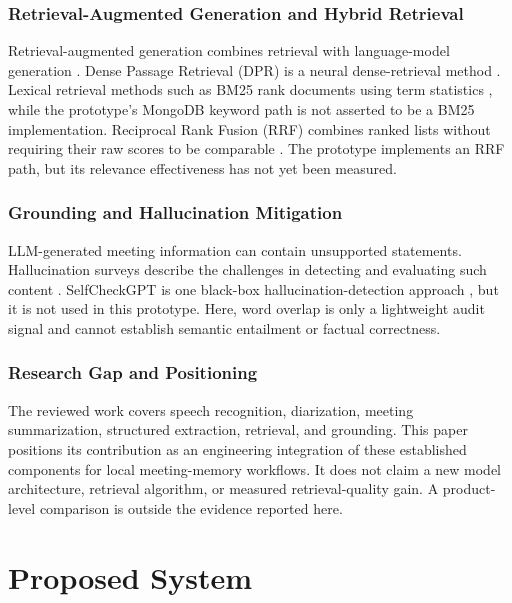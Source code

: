\documentclass[conference]{IEEEtran}
\begin{document}
\subsubsection{Retrieval-Augmented Generation and Hybrid Retrieval}

Retrieval-augmented generation combines retrieval with language-model generation \cite{rag}. Dense Passage Retrieval (DPR) is a neural dense-retrieval method \cite{dpr}. Lexical retrieval methods such as BM25 rank documents using term statistics \cite{bm25}, while the prototype's MongoDB keyword path is not asserted to be a BM25 implementation. Reciprocal Rank Fusion (RRF) combines ranked lists without requiring their raw scores to be comparable \cite{fusion}. The prototype implements an RRF path, but its relevance effectiveness has not yet been measured.

\subsubsection{Grounding and Hallucination Mitigation}

LLM-generated meeting information can contain unsupported statements. Hallucination surveys describe the challenges in detecting and evaluating such content \cite{halluc_survey}. SelfCheckGPT is one black-box hallucination-detection approach \cite{selfcheckgpt}, but it is not used in this prototype. Here, word overlap is only a lightweight audit signal and cannot establish semantic entailment or factual correctness.

\subsubsection{Research Gap and Positioning}

The reviewed work covers speech recognition, diarization, meeting summarization, structured extraction, retrieval, and grounding. This paper positions its contribution as an engineering integration of these established components for local meeting-memory workflows. It does not claim a new model architecture, retrieval algorithm, or measured retrieval-quality gain. A product-level comparison is outside the evidence reported here.

\section{Proposed System}
\end{document}
